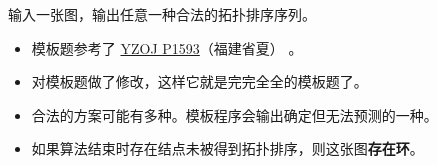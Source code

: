 \noindent 输入一张图，输出任意一种合法的拓扑排序序列。

\begin{itemize}
    \item 模板题参考了 \href{https://oiproxy.bugminer.top/OnlineJudge/problem_show.php?id=1593}{YZOJ P1593}（福建省夏） 。
    \item 对模板题做了修改，这样它就是完完全全的模板题了。
    \item 合法的方案可能有多种。模板程序会输出确定但无法预测的一种。
    \item 如果算法结束时存在结点未被得到拓扑排序，则这张图\textbf{存在环}。
\end{itemize}